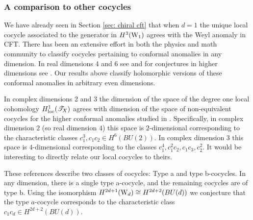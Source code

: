 \subsubsection{A comparison to other cocycles}

We have already seen in Section \ref{sec: chiral cft} that when $d=1$ the unique local cocycle associated to the generator in $H^3({\rm W}_1)$ agrees with the Weyl anomaly in CFT. 
There has been an extensive effort in both the physics and math community to classify cocycles pertaining to conformal anomalies in any dimension. 
In real dimensions 4 and 6 see \cite{Bonora, KMM} and for conjectures in higher dimensions see \cite{DeserSchwimmer}. 
Our results above classify holomorphic versions of these conformal anomalies in arbitrary even dimensions. 

In complex dimensions 2 and 3 the dimension of the space of the degree one local cohomology $H^1_{\rm loc}(\mathscr T_X)$ agrees with dimension of the space of non-equivalent cocycles for the higher conformal anomalies studied in \cite{Bonora, DeserSchwimmer}. 
Specifically, in complex dimension $2$ (so real dimension $4$) this space is $2$-dimensional corresponding to the characteristic classes $c_1^3, c_1c_2 \in H^6(BU(2))$. 
In complex dimension $3$ this space is $4$-dimensional corresponding to the classes $c_1^4, c_1^2c_2, c_1c_3, c_2^2$. 
It would be interesting to directly relate our local cocycles to theirs. 

These references describe two classes of cocycles: Type a and type b-cocycles.
In any dimension, there is a single type a-cocycle, and the remaining cocycles are of type b.
Using the isomorphism $H^{2d+1}({\rm W}_d) \cong H^{2d+2}(BU(d))$ we conjecture that the type $a$-cocycle corresponds to the characteristic class $c_1c_{d} \in H^{2d+2}(BU(d))$.


%